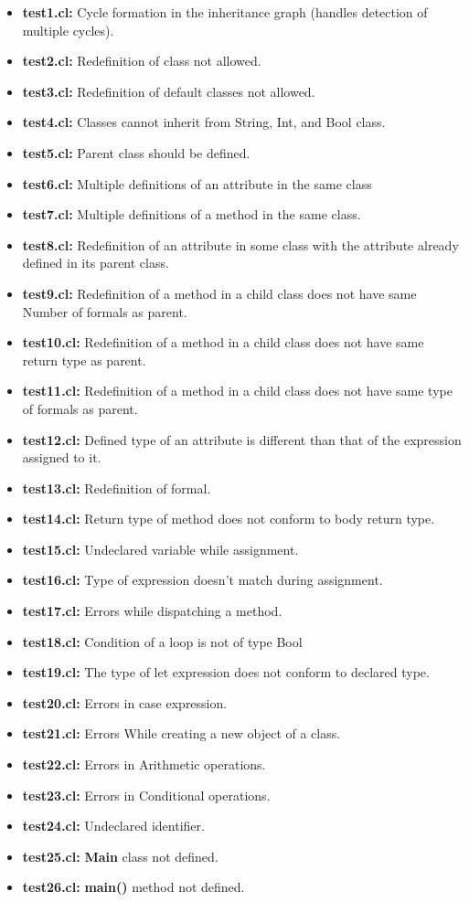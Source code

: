 \documentclass{article}
\begin{document}
\begin{itemize}
    \item \textbf{test1.cl: }Cycle formation in the inheritance graph (handles detection of multiple cycles).
    \item \textbf{test2.cl: }Redefinition of class not allowed.
    \item \textbf{test3.cl: }Redefinition of default classes not allowed.
    \item \textbf{test4.cl: }Classes cannot inherit from String, Int, and Bool class.
    \item \textbf{test5.cl: }Parent class should be defined.
    \item \textbf{test6.cl: }Multiple definitions of an attribute in the same class
    \item \textbf{test7.cl: }Multiple definitions of a method in the same class.
    \item \textbf{test8.cl: }Redefinition of an attribute in some class with the attribute already defined in its parent class.
    \item \textbf{test9.cl: }Redefinition of a method in a child class does not have same Number of formals as parent.
    \item \textbf{test10.cl: }Redefinition of a method in a child class does not have same return type as parent.
    \item \textbf{test11.cl: }Redefinition of a method in a child class does not have same type of formals as parent.
    \item \textbf{test12.cl: }Defined type of an attribute is different than that of the expression assigned to it.
    \item \textbf{test13.cl: }Redefinition of formal.
    \item \textbf{test14.cl: }Return type of method does not conform to body return type.
    \item \textbf{test15.cl: }Undeclared variable while assignment.
    \item \textbf{test16.cl: }Type of expression doesn't match during assignment.
    \item \textbf{test17.cl: }Errors while dispatching a method.
    \item \textbf{test18.cl: }Condition of a loop is not of type Bool
    \item \textbf{test19.cl: }The type of let expression does not conform to declared type.
    \item \textbf{test20.cl: }Errors in case expression.
    \item \textbf{test21.cl: }Errors While creating a new object of a class.
    \item \textbf{test22.cl: }Errors in Arithmetic operations.
    \item \textbf{test23.cl: }Errors in Conditional operations.
    \item \textbf{test24.cl: }Undeclared identifier.
    \item \textbf{test25.cl: }\textbf{Main} class not defined.
    \item \textbf{test26.cl: }\textbf{main()} method not defined.
\end{itemize}
\end{document}
